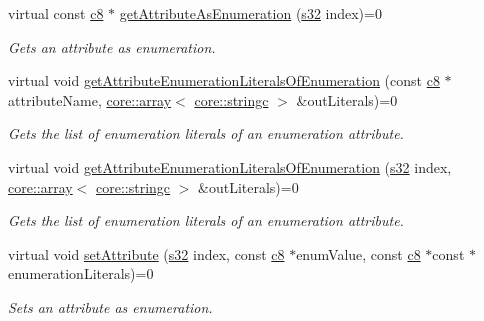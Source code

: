 \begin{DoxyCompactItemize}
virtual const \hyperlink{namespaceirr_a9395eaea339bcb546b319e9c96bf7410}{c8} $\ast$ \hyperlink{classirr_1_1io_1_1IAttributes_a195cd7ee6a50a6a10d22a874072a93c9}{get\+Attribute\+As\+Enumeration} (\hyperlink{namespaceirr_ac66849b7a6ed16e30ebede579f9b47c6}{s32} index)=0
\begin{DoxyCompactList}\small\item\em Gets an attribute as enumeration. \end{DoxyCompactList}\item 
virtual void \hyperlink{classirr_1_1io_1_1IAttributes_a74980af4d5297b74670f55711e25fd79}{get\+Attribute\+Enumeration\+Literals\+Of\+Enumeration} (const \hyperlink{namespaceirr_a9395eaea339bcb546b319e9c96bf7410}{c8} $\ast$attribute\+Name, \hyperlink{classirr_1_1core_1_1array}{core\+::array}$<$ \hyperlink{namespaceirr_1_1core_ab26a0e0359206b5a694f35c37c829d7f}{core\+::stringc} $>$ \&out\+Literals)=0
\begin{DoxyCompactList}\small\item\em Gets the list of enumeration literals of an enumeration attribute. \end{DoxyCompactList}\item 
virtual void \hyperlink{classirr_1_1io_1_1IAttributes_ae5d5d0c42a5a0199baf12abe971cb610}{get\+Attribute\+Enumeration\+Literals\+Of\+Enumeration} (\hyperlink{namespaceirr_ac66849b7a6ed16e30ebede579f9b47c6}{s32} index, \hyperlink{classirr_1_1core_1_1array}{core\+::array}$<$ \hyperlink{namespaceirr_1_1core_ab26a0e0359206b5a694f35c37c829d7f}{core\+::stringc} $>$ \&out\+Literals)=0
\begin{DoxyCompactList}\small\item\em Gets the list of enumeration literals of an enumeration attribute. \end{DoxyCompactList}\item 
\mbox{\label{classirr_1_1io_1_1IAttributes_a90962800fc16f01aa90e88a83188449b}} 
virtual void \hyperlink{classirr_1_1io_1_1IAttributes_a90962800fc16f01aa90e88a83188449b}{set\+Attribute} (\hyperlink{namespaceirr_ac66849b7a6ed16e30ebede579f9b47c6}{s32} index, const \hyperlink{namespaceirr_a9395eaea339bcb546b319e9c96bf7410}{c8} $\ast$enum\+Value, const \hyperlink{namespaceirr_a9395eaea339bcb546b319e9c96bf7410}{c8} $\ast$const $\ast$enumeration\+Literals)=0
\begin{DoxyCompactList}\small\item\em Sets an attribute as enumeration. \end{DoxyCompactList}\item 

\end{DoxyCompactItemize}
